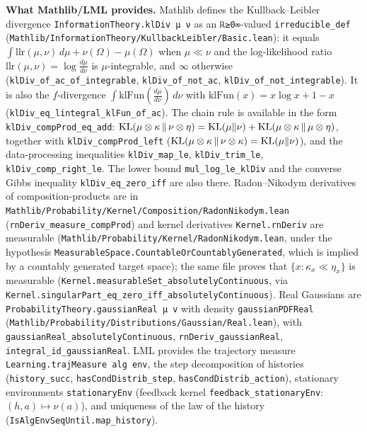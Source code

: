 \textbf{What Mathlib/LML provides.} Mathlib defines the Kullback--Leibler divergence
\texttt{InformationTheory.klDiv μ ν} as an \texttt{ℝ≥0∞}-valued \texttt{irreducible\_def}
(\texttt{Mathlib/InformationTheory/KullbackLeibler/Basic.lean}): it equals
$\int \mathrm{llr}(\mu,\nu)\,d\mu + \nu(\Omega) - \mu(\Omega)$ when $\mu \ll \nu$ and the
log-likelihood ratio $\mathrm{llr}(\mu,\nu) = \log \frac{d\mu}{d\nu}$ is $\mu$-integrable, and
$\infty$ otherwise (\texttt{klDiv\_of\_ac\_of\_integrable}, \texttt{klDiv\_of\_not\_ac},
\texttt{klDiv\_of\_not\_integrable}). It is also the $f$-divergence
$\int \mathrm{klFun}(\frac{d\mu}{d\nu})\,d\nu$ with $\mathrm{klFun}(x) = x\log x + 1 - x$
(\texttt{klDiv\_eq\_lintegral\_klFun\_of\_ac}). The chain rule is available in the form
\texttt{klDiv\_compProd\_eq\_add}:
$\mathrm{KL}(\mu \otimes \kappa \,\|\, \nu \otimes \eta) = \mathrm{KL}(\mu\|\nu) + \mathrm{KL}(\mu\otimes\kappa\,\|\,\mu\otimes\eta)$,
together with \texttt{klDiv\_compProd\_left} ($\mathrm{KL}(\mu\otimes\kappa\,\|\,\nu\otimes\kappa) = \mathrm{KL}(\mu\|\nu)$),
and the data-processing inequalities \texttt{klDiv\_map\_le}, \texttt{klDiv\_trim\_le},
\texttt{klDiv\_comp\_right\_le}. The lower bound \texttt{mul\_log\_le\_klDiv} and the converse
Gibbs inequality \texttt{klDiv\_eq\_zero\_iff} are also there. Radon--Nikodym derivatives of
composition-products are in \texttt{Mathlib/Probability/Kernel/Composition/RadonNikodym.lean}
(\texttt{rnDeriv\_measure\_compProd}) and kernel derivatives \texttt{Kernel.rnDeriv} are
measurable (\texttt{Mathlib/Probability/Kernel/RadonNikodym.lean}, under the hypothesis
\texttt{MeasurableSpace.CountableOrCountablyGenerated}, which is implied by a countably
generated target space); the same file proves that $\{x : \kappa_x \ll \eta_x\}$ is
measurable (\texttt{Kernel.measurableSet\_absolutelyContinuous}, via
\texttt{Kernel.singularPart\_eq\_zero\_iff\_absolutelyContinuous}). Real Gaussians are
\texttt{ProbabilityTheory.gaussianReal μ v} with density \texttt{gaussianPDFReal}
(\texttt{Mathlib/Probability/Distributions/Gaussian/Real.lean}), with
\texttt{gaussianReal\_absolutelyContinuous}, \texttt{rnDeriv\_gaussianReal},
\texttt{integral\_id\_gaussianReal}. LML provides the trajectory measure
\texttt{Learning.trajMeasure alg env}, the step decomposition of histories
(\texttt{history\_succ}, \texttt{hasCondDistrib\_step}, \texttt{hasCondDistrib\_action}),
stationary environments \texttt{stationaryEnv} (feedback kernel
\texttt{feedback\_stationaryEnv}: $(h,a) \mapsto \nu(a)$), and uniqueness of the law of the
history (\texttt{IsAlgEnvSeqUntil.map\_history}).

